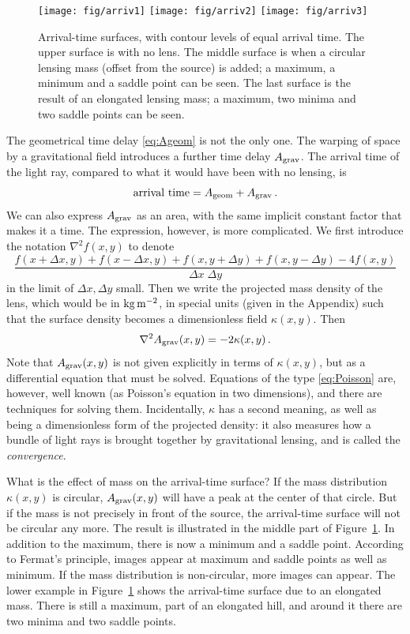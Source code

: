\documentclass[12pt,preprint]{aastex}
\newcommand{\figref}[1]{Figure~\ref{fig:#1}}
\begin{document}
\begin{figure}
\centering
\texttt{[image: fig/arriv1]}
\texttt{[image: fig/arriv2]}
\texttt{[image: fig/arriv3]}
\caption{Arrival-time surfaces, with contour levels of equal arrival
  time.  The upper surface is with no lens.  The middle surface is
  when a circular lensing mass (offset from the source) is added; a
  maximum, a minimum and a saddle point can be seen.  The last surface
  is the result of an elongated lensing mass; a maximum, two minima
  and two saddle points can be seen.
}
\label{fig:arriv}
\end{figure}

The geometrical time delay \eqref{eq:Ageom} is not the only one.  The
warping of space by a gravitational field introduces a further time
delay $A_{\rm grav}$.  The arrival time of the light ray, compared to
what it would have been with no lensing, is
\begin{equation} \label{eq:Aarriv}
\hbox{arrival time} = A_{\rm geom} + A_{\rm grav} \,.
\end{equation}
We can also express $A_{\rm grav}$ as an area, with the same implicit
constant factor that makes it a time.  The expression, however, is
more complicated.  We first introduce the notation $\nabla^2 f(x,y)$
to denote
\begin{equation}
 \frac{ f(x+\Delta x, y) + f(x-\Delta x, y) +
        f(x, y+\Delta y) + f(x, y-\Delta y) - 4 f(x,y) }
      {\Delta x \; \Delta y}
\end{equation}
in the limit of $\Delta x,\Delta y$ small.  Then we write the
projected mass density of the lens, which would be in $\rm
kg\,m^{-2}$, in special units (given in the Appendix) such that the
surface density becomes a dimensionless field $\kappa(x,y)$.  Then
\begin{equation} \label{eq:Poisson}
\nabla^2 A_{\rm grav}(x,y) = -2\kappa(x,y) \,.
\end{equation}
Note that $A_{\rm grav}(x,y)$ is not given explicitly in terms of
$\kappa(x,y)$, but as a differential equation that must be solved.
Equations of the type \eqref{eq:Poisson} are, however, well known (as
Poisson's equation in two dimensions), and there are techniques for
solving them.  Incidentally, $\kappa$ has a second meaning, as well as
being a dimensionless form of the projected density: it also
measures how a bundle of light rays is brought together by
gravitational lensing, and is called the {\em convergence}.

What is the effect of mass on the arrival-time surface?  If the mass
distribution $\kappa(x,y)$ is circular, $A_{\rm grav}(x,y)$ will have
a peak at the center of that circle.  But if the mass is not precisely
in front of the source, the arrival-time surface will not be circular
any more.  The result is illustrated in the middle part of
\figref{arriv}.  In addition to the maximum, there is now a
minimum and a saddle point.  According to Fermat's principle, images
appear at maximum and saddle points as well as minimum.  If the mass
distribution is non-circular, more images can appear.  The lower
example in \figref{arriv} shows the arrival-time surface due
to an elongated mass.  There is still a maximum, part of an elongated
hill, and around it there are two minima and two saddle points.
\end{document}
